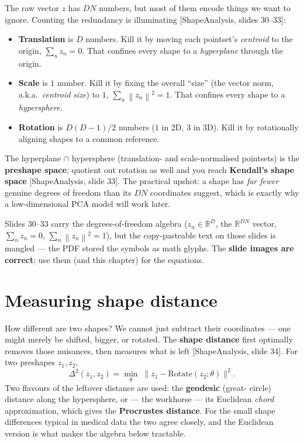 \documentclass[11pt]{article}
\newcommand{\R}{\mathbb{R}}
\newcommand{\norm}[1]{\left\lVert #1 \right\rVert}
\newcommand{\deck}[1]{\textsf{\small[#1]}}
\begin{document}
The raw vector $z$ has $DN$ numbers, but most of them encode things we want to
ignore. Counting the redundancy is illuminating \deck{ShapeAnalysis, slides
30--33}:

\begin{itemize}[leftmargin=*]
  \item \textbf{Translation} is $D$ numbers. Kill it by moving each pointset's
  \emph{centroid} to the origin, $\sum_n z_n = 0$. That confines every shape to
  a \emph{hyperplane} through the origin.
  \item \textbf{Scale} is $1$ number. Kill it by fixing the overall ``size''
  (the vector norm, a.k.a.\ \emph{centroid size}) to $1$, $\sum_n\norm{z_n}^2=1$.
  That confines every shape to a \emph{hypersphere}.
  \item \textbf{Rotation} is $D(D-1)/2$ numbers ($1$ in 2D, $3$ in 3D). Kill it
  by rotationally aligning shapes to a common reference.
\end{itemize}

The hyperplane $\cap$ hypersphere (translation- and scale-normalised pointsets)
is the \textbf{preshape space}; quotient out rotation as well and you reach
\textbf{Kendall's shape space} \deck{ShapeAnalysis, slide 33}. The practical
upshot: a shape has \emph{far fewer} genuine degrees of freedom than its $DN$
coordinates suggest, which is exactly why a low-dimensional PCA model will work
later.

\begin{notebox}
Slides 30--33 carry the degrees-of-freedom algebra ($z_n\in\R^{D}$, the
$\R^{DN}$ vector, $\sum_n z_n=0$, $\sum_n\norm{z_n}^2=1$), but the copy-pasteable
text on those slides is mangled --- the PDF stored the symbols as math glyphs.
The \textbf{slide images are correct}; use them (and this chapter) for the
equations.
\end{notebox}

\section{Measuring shape distance}

How different are two shapes? We cannot just subtract their coordinates --- one
might merely be shifted, bigger, or rotated. The \textbf{shape distance} first
optimally removes those nuisances, then measures what is left
\deck{ShapeAnalysis, slide 34}. For two preshapes $z_1, z_2$,
\[
\Delta^2(z_1,z_2) = \min_{\theta}\; \big\| z_1 - \mathrm{Rotate}(z_2;\theta)\big\|^2 .
\]
Two flavours of the leftover distance are used: the \textbf{geodesic} (great-
circle) distance along the hypersphere, or --- the workhorse --- its Euclidean
\emph{chord} approximation, which gives the \textbf{Procrustes distance}. For the
small shape differences typical in medical data the two agree closely, and the
Euclidean version is what makes the algebra below tractable.
\end{document}
